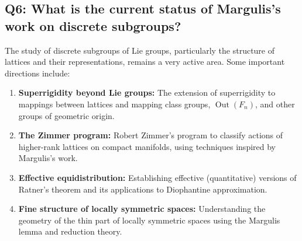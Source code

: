 \subsection*{Q6: What is the current status of Margulis's work on discrete subgroups?}

The study of discrete subgroups of Lie groups, particularly the structure of lattices and their representations, remains a very active area. Some important directions include:
\begin{enumerate}
    \item \textbf{Superrigidity beyond Lie groups:} The extension of superrigidity to mappings between lattices and mapping class groups, \(\operatorname{Out}(F_n)\), and other groups of geometric origin.
    \item \textbf{The Zimmer program:} Robert Zimmer's program to classify actions of higher-rank lattices on compact manifolds, using techniques inspired by Margulis's work.
    \item \textbf{Effective equidistribution:} Establishing effective (quantitative) versions of Ratner's theorem and its applications to Diophantine approximation.
    \item \textbf{Fine structure of locally symmetric spaces:} Understanding the geometry of the thin part of locally symmetric spaces using the Margulis lemma and reduction theory.
\end{enumerate}

